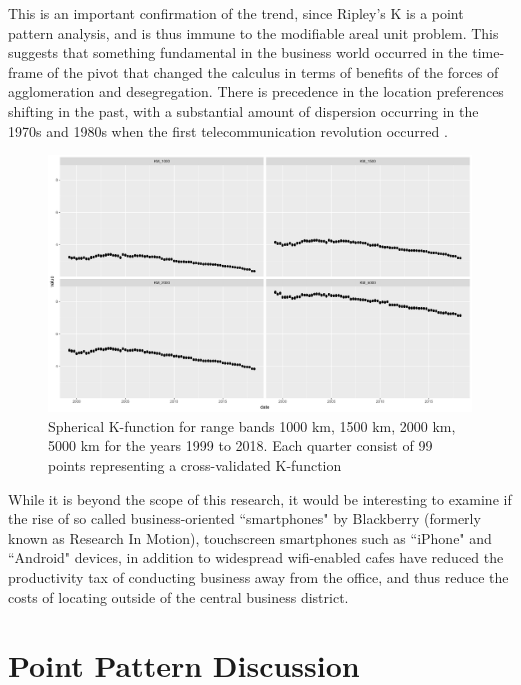 This is an important confirmation of the trend, since Ripley's K is a point pattern analysis, and is thus immune to the  modifiable areal unit problem.  This suggests that something fundamental in the business world occurred in the time-frame of the pivot that changed the calculus in terms of benefits of the forces of agglomeration and desegregation.  There is precedence in the location preferences shifting in the past, with a substantial amount of dispersion occurring in the 1970s and 1980s when the first telecommunication revolution occurred \citep{bodenmanfirm2000}.
\begin{figure}[h]
	\centering
	\includegraphics[width=.9\textwidth]{Figures/ChapterIII/Cross_val_1000_5000.pdf} 
	\caption[Spherical K-function for Range Bands 1000km to 5000km]{Spherical K-function for range bands 1000 km, 1500 km, 2000 km, 5000 km for the years 1999 to 2018. Each quarter consist of 99 points representing a cross-validated K-function}
	\label{fig:Kfunction1000to5000}
\end{figure}


While it is beyond the scope of this research, it would be interesting to examine if the rise of so called business-oriented ``smartphones" by Blackberry (formerly known as Research In Motion), touchscreen smartphones such as ``iPhone" and ``Android" devices, in addition to widespread wifi-enabled cafes have reduced the productivity tax of conducting business away from the office, and thus reduce the costs of locating outside of the central business district.   



\section{Point Pattern Discussion} 

